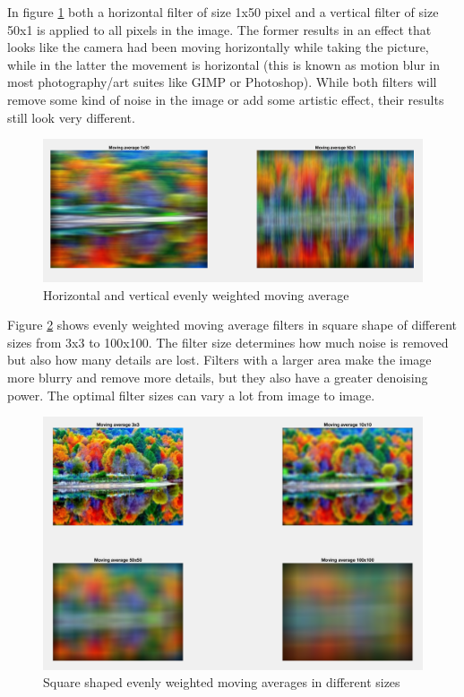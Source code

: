 In figure \ref{fig:task9} both a horizontal filter of size 1x50 pixel and a vertical filter of size 50x1 is applied to all pixels in the image. The former results in an effect that looks like the camera had been moving horizontally while taking the picture, while in the latter the movement is horizontal (this is known as motion blur in most photography/art suites like GIMP or Photoshop). While both filters will remove some kind of noise in the image or add some artistic effect, their results still look very different. 

\begin{figure}[!hbt]
  \includegraphics[width=\textwidth]{./img/task9.png}
  \caption{Horizontal and vertical evenly weighted moving average}
  \label{fig:task9}
\end{figure}

Figure \ref{fig:task10} shows evenly weighted moving average filters in square shape of different sizes from 3x3 to 100x100. The filter size determines how much noise is removed but also how many details are lost. Filters with a larger area make the image more blurry and remove more details, but they also have a greater denoising power. The optimal filter sizes can vary a lot from image to image.

\begin{figure}[!hbt]
  \includegraphics[width=\textwidth]{./img/task10.png}
  \caption{Square shaped evenly weighted moving averages in different sizes}
  \label{fig:task10}
\end{figure}


